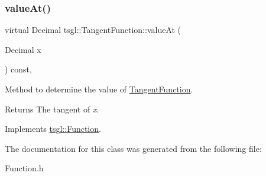 \subsubsection{\texorpdfstring{value\+At()}{valueAt()}}
{\footnotesize\ttfamily virtual Decimal tsgl\+::\+Tangent\+Function\+::value\+At (\begin{DoxyParamCaption}\item[{Decimal}]{x }\end{DoxyParamCaption}) const\hspace{0.3cm}{\ttfamily [inline]}, {\ttfamily [virtual]}}



Method to determine the value of \hyperlink{classtsgl_1_1_tangent_function}{Tangent\+Function}. 

\begin{DoxyReturn}{Returns}
The tangent of {\itshape x}. 
\end{DoxyReturn}


Implements \hyperlink{classtsgl_1_1_function_affb7b3b19a04efefa29a9870d666e912}{tsgl\+::\+Function}.



The documentation for this class was generated from the following file\+:\begin{DoxyCompactItemize}
\item 
Function.\+h\end{DoxyCompactItemize}
